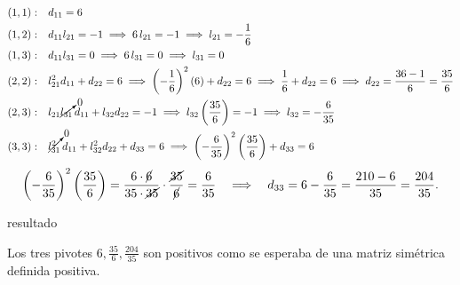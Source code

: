 \begin{align*}
  (1,1):&\quad d_{11} = 6\\
  (1,2):&\quad d_{11}l_{21} = -1 \;\Longrightarrow\; 6\,l_{21} = -1 \;\Longrightarrow\; l_{21} = -\frac16\\
  (1,3):&\quad d_{11}l_{31} = 0 \;\Longrightarrow\; 6\,l_{31} = 0 \;\Longrightarrow\; l_{31} = 0\\
  (2,2):&\quad l_{21}^2 d_{11} + d_{22} = 6 \;\Longrightarrow\;
           \left(-\frac16\right)^2(6) + d_{22} = 6 \;\Longrightarrow\;
           \frac16 + d_{22} = 6 \;\Longrightarrow\; d_{22} = \frac{36 - 1}{6} = \frac{35}{6}\\
  (2,3):&\quad l_{21}\cancelto{0}{l_{31}}\,d_{11} + l_{32}d_{22} = -1 \;\Longrightarrow\;
           l_{32}\left(\frac{35}{6}\right) = -1 \;\Longrightarrow\; l_{32} = -\frac{6}{35}\\
  (3,3):&\quad \cancelto{0}{l_{31}^2}\,d_{11} + l_{32}^2 d_{22} + d_{33} = 6 \;\Longrightarrow\;
           \left(-\frac{6}{35}\right)^2\left(\frac{35}{6}\right) + d_{33} = 6
\end{align*}
\[
  \left(-\frac{6}{35}\right)^2\left(\frac{35}{6}\right)
  = \frac{6\cdot\cancel{6}}{35\cdot\cancel{35}}\cdot\frac{\cancel{35}}{\cancel{6}}
  = \frac{6}{35}
  \quad\Longrightarrow\quad
  d_{33} = 6 - \frac{6}{35} = \frac{210 - 6}{35} = \frac{204}{35}.
\]

resultado

Los tres pivotes $6, \frac{35}{6}, \frac{204}{35}$ son positivos como se esperaba de una matriz simétrica definida positiva.

